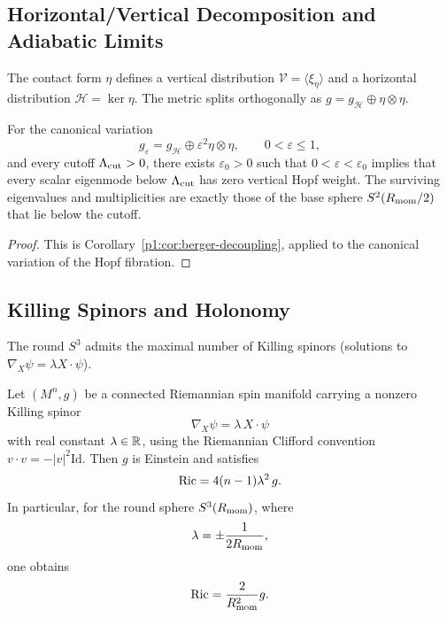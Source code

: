\documentclass[11pt]{article}
\begin{document}
\subsection{Horizontal/Vertical Decomposition and Adiabatic Limits}
\label{p1:der:fast-slow}
The contact form $\eta$ defines a vertical distribution $\mathcal{V} = \langle\xi_\eta\rangle$ and a horizontal distribution $\mathcal{H} = \ker\eta$. The metric splits orthogonally as $g = g_{\mathcal{H}} \oplus \eta \otimes \eta$.
\begin{proposition}
\label{p1:prop:adiabatic-decoupling}
For the canonical variation
\[
g_\varepsilon=g_{\mathcal H}\oplus\varepsilon^2\eta\otimes\eta,
\qquad 0<\varepsilon\le1,
\]
and every cutoff \(\Lambda_{\mathrm{cut}}>0\), there exists \(\varepsilon_0>0\) such that
\(0<\varepsilon<\varepsilon_0\) implies that every scalar eigenmode below
\(\Lambda_{\mathrm{cut}}\) has zero vertical Hopf weight.  The surviving eigenvalues and
multiplicities are exactly those of the base sphere \(S^2(R_{\mathrm{mom}}/2)\) that lie
below the cutoff.
\end{proposition}

\begin{proof}
This is Corollary~\ref{p1:cor:berger-decoupling}, applied to the canonical
variation of the Hopf fibration.
\end{proof}

\subsection{Killing Spinors and Holonomy}
\label{p1:der:killing-spinors}
The round $S^3$ admits the maximal number of Killing spinors (solutions to $\nabla_X\psi = \lambda X\cdot\psi$).
\begin{proposition}
\label{p1:prop:killing-implies-einstein}
Let $(M^n,g)$ be a connected Riemannian spin manifold carrying a nonzero Killing spinor
\[
\nabla_X\psi=\lambda\,X\cdot\psi
\]
with real constant $\lambda\in\mathbb{R}$, using the Riemannian Clifford convention
$v\cdot v=-|v|^2\mathrm{Id}$. Then $g$ is Einstein and satisfies
\[
\operatorname{Ric} = 4(n-1)\lambda^2\, g.
\]
In particular, for the round sphere $S^3(R_{\mathrm{mom}})$, where
\[
\lambda=\pm \frac{1}{2R_{\mathrm{mom}}},
\]
one obtains
\[
\operatorname{Ric}=\frac{2}{R_{\mathrm{mom}}^2}g.
\]
\end{proposition}
\end{document}

